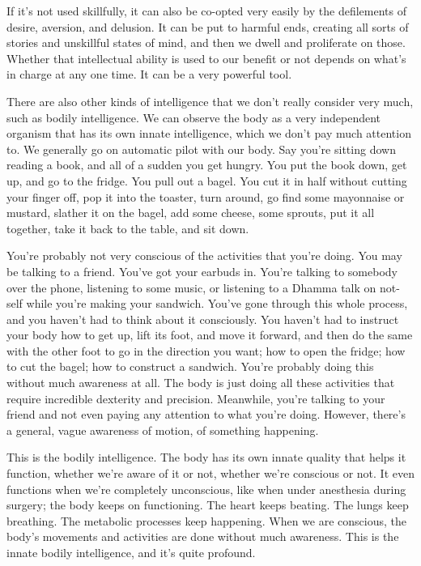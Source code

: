 If it's not used skillfully, it can also be co-opted very easily by the defilements of desire, aversion, and delusion. It can be put to harmful ends, creating all sorts of stories and unskillful states of mind, and then we dwell and proliferate on those. Whether that intellectual ability is used to our benefit or not depends on what's in charge at any one time. It can be a very powerful tool.

There are also other kinds of intelligence that we don't really consider very much, such as bodily intelligence. We can observe the body as a very independent organism that has its own innate intelligence, which we don't pay much attention to. We generally go on automatic pilot with our body. Say you're sitting down reading a book, and all of a sudden you get hungry. You put the book down, get up, and go to the fridge. You pull out a bagel. You cut it in half without cutting your finger off, pop it into the toaster, turn around, go find some mayonnaise or mustard, slather it on the bagel, add some cheese, some sprouts, put it all together, take it back to the table, and sit down.

You're probably not very conscious of the activities that you're doing. You may be talking to a friend. You've got your earbuds in. You're talking to somebody over the phone, listening to some music, or listening to a Dhamma talk on not-self while you're making your sandwich. You've gone through this whole process, and you haven't had to think about it consciously. You haven't had to instruct your body how to get up, lift its foot, and move it forward, and then do the same with the other foot to go in the direction you want; how to open the fridge; how to cut the bagel; how to construct a sandwich. You're probably doing this without much awareness at all. The body is just doing all these activities that require incredible dexterity and precision. Meanwhile, you're talking to your friend and not even paying any attention to what you're doing. However, there's a general, vague awareness of motion, of something happening.

This is the bodily intelligence. The body has its own innate quality that helps it function, whether we're aware of it or not, whether we're conscious or not. It even functions when we're completely unconscious, like when under anesthesia during surgery; the body keeps on functioning. The heart keeps beating. The lungs keep breathing. The metabolic processes keep happening. When we are conscious, the body's movements and activities are done without much awareness. This is the innate bodily intelligence, and it's quite profound.

